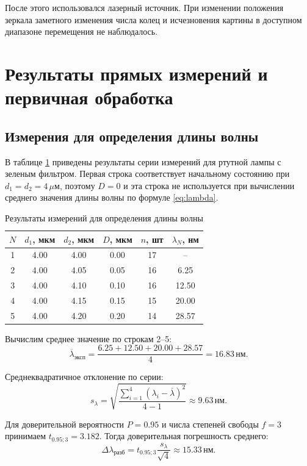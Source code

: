 \documentclass[12pt,a4paper]{article}
\newcommand{\um}{\ensuremath{\,\mu\text{м}}}
\newcommand{\nm}{\ensuremath{\,\text{нм}}}
\begin{document}
После этого использовался лазерный источник. При изменении положения зеркала заметного изменения числа колец и исчезновения картины в доступном диапазоне перемещения не наблюдалось.

\section{Результаты прямых измерений и первичная обработка}

\subsection{Измерения для определения длины волны}

В таблице \ref{tab:lambda_raw} приведены результаты серии измерений для ртутной лампы с зеленым фильтром. Первая строка соответствует начальному состоянию при $d_1=d_2=4\um$, поэтому $D=0$ и эта строка не используется при вычислении среднего значения длины волны по формуле \eqref{eq:lambda}.

\begin{table}[H]
\centering
\caption{Результаты измерений для определения длины волны}
\label{tab:lambda_raw}
\begin{tabular}{cccccc}
\toprule
$N$ & $d_1$, мкм & $d_2$, мкм & $D$, мкм & $n$, шт & $\lambda_N$, нм \\
\midrule
1 & 4.00 & 4.00 & 0.00 & 17 & -- \\
2 & 4.00 & 4.05 & 0.05 & 16 & 6.25 \\
3 & 4.00 & 4.10 & 0.10 & 16 & 12.50 \\
4 & 4.00 & 4.15 & 0.15 & 15 & 20.00 \\
5 & 4.00 & 4.20 & 0.20 & 14 & 28.57 \\
\bottomrule
\end{tabular}
\end{table}

Вычислим среднее значение по строкам 2--5:
\begin{equation}
    \overline{\lambda}_{\text{эксп}} = \frac{6.25+12.50+20.00+28.57}{4}=16.83\nm.
\end{equation}

Среднеквадратичное отклонение по серии:
\begin{equation}
    s_\lambda = \sqrt{\frac{\sum\limits_{i=1}^{4}(\lambda_i-\overline{\lambda})^2}{4-1}} \approx 9.63\nm.
\end{equation}

Для доверительной вероятности $P=0.95$ и числа степеней свободы $f=3$ принимаем $t_{0.95;3}=3.182$. Тогда доверительная погрешность среднего:
\begin{equation}
    \Delta\lambda_{\text{разб}} = t_{0.95;3}\frac{s_\lambda}{\sqrt{4}} \approx 15.33\nm.
\end{equation}
\end{document}
